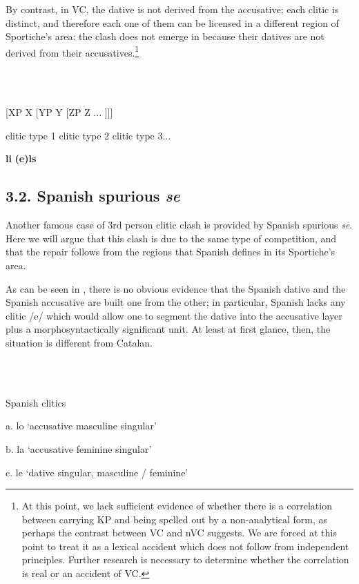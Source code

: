 \documentclass[output=paper,modfonts,nonflat]{langsci/langscibook}
\begin{document}
By contrast, in VC, the dative is not derived from the accusative; each clitic is distinct, and therefore each one of them can be licensed in a different region of Sportiche’s area: the clash does not emerge in  because their datives are not derived from their accusatives.\footnote{At this point, we lack sufficient evidence of whether there is a correlation between carrying KP and being spelled out by a non-analytical form, as perhaps the contrast between VC and nVC suggests. We are forced at this point to treat it as a lexical accident which does not follow from independent principles. Further research is necessary to determine whether the correlation is real or an accident of VC.}

\ea%
    \label{ex:key:17}
    \gll\\
        \\
    \glt
    \z

         [XP    X  [YP    Y  [ZP  Z  ...  ]]]

     clitic type 1  clitic type 2    clitic type 3...

        \textbf{li}      \textbf{(e)ls}

\subsection{3.2. Spanish spurious \textit{se}}

An\-\-\-other famous case of 3rd person clitic clash is provided by Spanish spurious \textit{se}. Here we will argue that this clash is due to the same type of competition, and that the repair follows from the regions that Spanish defines in its Sportiche’s area.

As can be seen in , there is no obvious evidence that the Spanish dative and the Spanish accusative are built one from the other; in particular, Spanish lacks any clitic /e/ which would allow one to segment the dative into the accusative layer plus a morphosyntactically significant unit. At least at first glance, then, the situation is different from Catalan.

\ea%
    \label{ex:key:18}
    \gll\\
        \\
    \glt
    \z

         Spanish clitics

  a. lo ‘accusative masculine singular’

  b. la ‘accusative feminine singular’

  c. le ‘dative singular, masculine / feminine’
\end{document}
